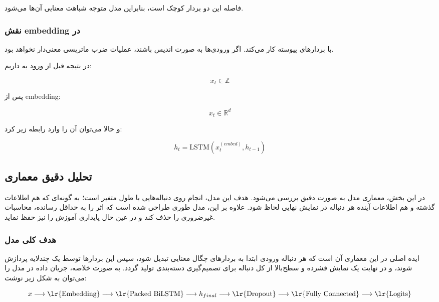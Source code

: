 \documentclass{article}
\begin{document}
فاصله این دو بردار کوچک است، بنابراین مدل متوجه شباهت معنایی آن‌ها می‌شود.

\subsubsection{نقش embedding در }

 با بردارهای پیوسته کار می‌کند. 
اگر ورودی‌ها به صورت اندیس باشند، عملیات ضرب ماتریسی معنی‌دار نخواهد بود.

در نتیجه قبل از ورود به  داریم:

\begin{equation}
	x_t \in \mathbb{Z}
\end{equation}

پس از embedding:

\begin{equation}
	x_t \in \mathbb{R}^d
\end{equation}

و حالا می‌توان آن را وارد رابطه زیر کرد:

\begin{equation}
	h_t = \text{LSTM}(x_t^{(embed)}, h_{t-1})
\end{equation}

\subsection{تحلیل دقیق معماری }

در این بخش، معماری مدل  به صورت دقیق بررسی می‌شود. هدف این مدل، انجام  روی دنباله‌هایی با طول متغیر است؛ به گونه‌ای که هم اطلاعات گذشته و هم اطلاعات آینده هر دنباله در نمایش نهایی لحاظ شود. علاوه بر این، مدل طوری طراحی شده است که اثر  را به حداقل رسانده، محاسبات غیرضروری را حذف کند و در عین حال پایداری آموزش را نیز حفظ نماید.

\subsubsection{هدف کلی مدل}

ایده اصلی در این معماری آن است که هر دنباله ورودی ابتدا به بردارهای چگال معنایی تبدیل شود، سپس این بردارها توسط یک  چندلایه پردازش شوند، و در نهایت یک نمایش فشرده و سطح‌بالا از کل دنباله برای تصمیم‌گیری دسته‌بندی تولید گردد. به صورت خلاصه، جریان داده در مدل را می‌توان به شکل زیر نوشت:

\begin{equation}
	x \longrightarrow \text{\lr{Embedding}} \longrightarrow \text{\lr{Packed BiLSTM}} \longrightarrow h_{final} \longrightarrow \text{\lr{Dropout}} \longrightarrow \text{\lr{Fully Connected}} \longrightarrow \text{\lr{Logits}}
\end{equation}
\end{document}

